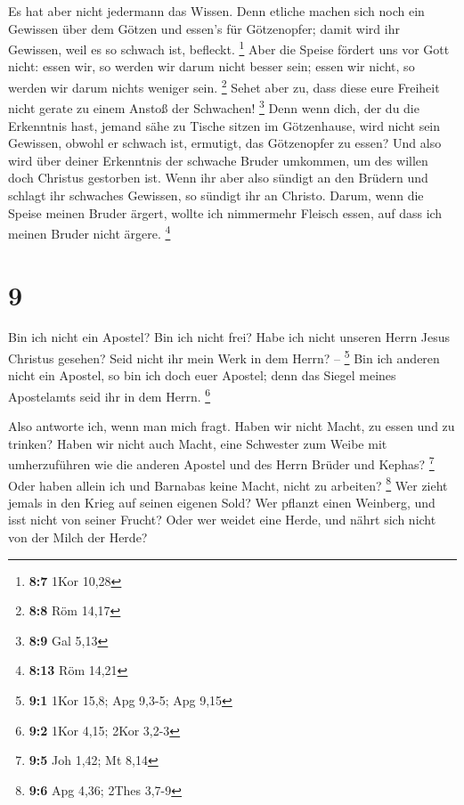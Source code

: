  Es hat aber nicht jedermann das Wissen. Denn etliche
machen sich noch ein Gewissen über dem Götzen und essen's für
Götzenopfer; damit wird ihr Gewissen, weil es so schwach ist, befleckt.
\footnote{\textbf{8:7} 1Kor 10,28}  Aber die Speise
fördert uns vor Gott nicht: essen wir, so werden wir darum nicht besser
sein; essen wir nicht, so werden wir darum nichts weniger sein.
\footnote{\textbf{8:8} Röm 14,17}  Sehet aber zu, dass
diese eure Freiheit nicht gerate zu einem Anstoß der Schwachen!
\footnote{\textbf{8:9} Gal 5,13}  Denn wenn dich, der du
die Erkenntnis hast, jemand sähe zu Tische sitzen im Götzenhause, wird
nicht sein Gewissen, obwohl er schwach ist, ermutigt, das Götzenopfer zu
essen?  Und also wird über deiner Erkenntnis der schwache
Bruder umkommen, um des willen doch Christus gestorben ist.
 Wenn ihr aber also sündigt an den Brüdern und schlagt
ihr schwaches Gewissen, so sündigt ihr an Christo. 
Darum, wenn die Speise meinen Bruder ärgert, wollte ich nimmermehr
Fleisch essen, auf dass ich meinen Bruder nicht ärgere. \footnote{\textbf{8:13}
  Röm 14,21}

\hypertarget{section-4}{%
\section{9}\label{section-4}}

 Bin ich nicht ein Apostel? Bin ich nicht frei? Habe ich
nicht unseren Herrn Jesus Christus gesehen? Seid nicht ihr mein Werk in
dem Herrn? -- \footnote{\textbf{9:1} 1Kor 15,8; Apg 9,3-5; Apg 9,15}
 Bin ich anderen nicht ein Apostel, so bin ich doch euer
Apostel; denn das Siegel meines Apostelamts seid ihr in dem Herrn.
\footnote{\textbf{9:2} 1Kor 4,15; 2Kor 3,2-3}

 Also antworte ich, wenn man mich fragt. 
Haben wir nicht Macht, zu essen und zu trinken?  Haben wir
nicht auch Macht, eine Schwester zum Weibe mit umherzuführen wie die
anderen Apostel und des Herrn Brüder und Kephas? \footnote{\textbf{9:5}
  Joh 1,42; Mt 8,14}  Oder haben allein ich und Barnabas
keine Macht, nicht zu arbeiten? \footnote{\textbf{9:6} Apg 4,36; 2Thes
  3,7-9}  Wer zieht jemals in den Krieg auf seinen eigenen
Sold? Wer pflanzt einen Weinberg, und isst nicht von seiner Frucht? Oder
wer weidet eine Herde, und nährt sich nicht von der Milch der Herde?

